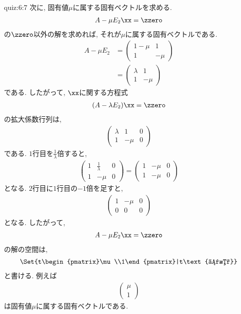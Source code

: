 \begin{answerof}{quiz:6:7}
次に,
固有値$\mu$に属する固有ベクトルを求める.
\begin{align*}
  A-\mu E_2 \xx=\zzero 
\end{align*}
の$\zzero$以外の解を求めれば,
それが$\mu$に属する固有ベクトルである.
\begin{align*}
  A-\mu E_2
  & =
  \begin{pmatrix}1-\mu&1\\1&-\mu\end{pmatrix}  \\
  & =
    \begin{pmatrix}\lambda&1\\1&-\mu\end{pmatrix}
\end{align*}
である. したがって, $\xx$に関する方程式
\begin{align*}
  (A-\lambda E_2) \xx=\zzero 
\end{align*}
の拡大係数行列は,
\begin{align*}
  \begin{pmatrix}
    \lambda&1&0\\
    1&-\mu&0
  \end{pmatrix}
\end{align*}
である. $1$行目を$\frac{1}{\lambda}$倍すると,
\begin{align*}
  \begin{pmatrix}
    1&\frac{1}{\lambda}&0\\
    1&-\mu&0
  \end{pmatrix}
  =
  \begin{pmatrix}
    1&-\mu&0\\
    1&-\mu&0
  \end{pmatrix}
\end{align*}
となる.
$2$行目に$1$行目の$-1$倍を足すと,
\begin{align*}
  \begin{pmatrix}
    1&-\mu&0\\
    0&0&0
  \end{pmatrix}
\end{align*}
となる.
したがって,
\begin{align*}
  A-\mu E_2 \xx=\zzero 
\end{align*}
の解の空間は,
\begin{align*}
\Set{t\begin{pmatrix}\mu\\1\end{pmatrix}|t\text{は数}}
\end{align*}
と書ける.
例えば
\begin{align*}
  \begin{pmatrix}\mu\\1\end{pmatrix}
\end{align*}
は固有値$\mu$に属する固有ベクトルである.



\end{answerof}
